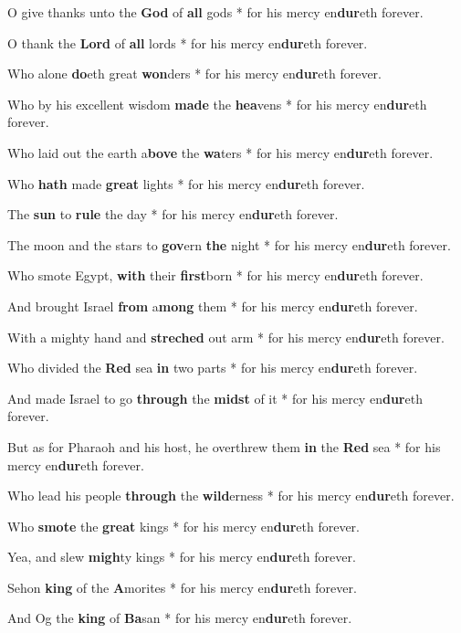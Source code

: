 \begin{multicols}{2}
	O give thanks unto the \textbf{God} of \textbf{all} gods * for his mercy en\textbf{dur}eth forever.
	
	O thank the \textbf{Lord} of \textbf{all} lords * for his mercy en\textbf{dur}eth forever.
	
	Who alone \textbf{do}eth great \textbf{won}ders * for his mercy en\textbf{dur}eth forever.
	
	Who by his excellent wisdom \textbf{made} the \textbf{hea}vens * for his mercy en\textbf{dur}eth forever.
	
	Who laid out the earth a\textbf{bove} the \textbf{wa}ters * for his mercy en\textbf{dur}eth forever.
	
	Who \textbf{hath} made \textbf{great} lights * for his mercy en\textbf{dur}eth forever.
	
	The \textbf{sun} to \textbf{rule} the day * for his mercy en\textbf{dur}eth forever.
	
	The moon and the stars to \textbf{gov}ern \textbf{the} night * for his mercy en\textbf{dur}eth forever.
	
	Who smote Egypt, \textbf{with} their \textbf{first}born * for his mercy en\textbf{dur}eth forever.
	
	And brought Israel \textbf{from} a\textbf{mong} them * for his mercy en\textbf{dur}eth forever.
	
	With a mighty hand and \textbf{streched} out arm * for his mercy en\textbf{dur}eth forever.
	
	Who divided the \textbf{Red} sea \textbf{in} two parts * for his mercy en\textbf{dur}eth forever.
	
	And made Israel to go \textbf{through} the \textbf{midst} of it * for his mercy en\textbf{dur}eth forever.
	
	But as for Pharaoh and his host, he overthrew them \textbf{in} the \textbf{Red} sea * for his mercy en\textbf{dur}eth forever.
	
	Who lead his people \textbf{through} the \textbf{wild}erness * for his mercy en\textbf{dur}eth forever.
	
	Who \textbf{smote} the \textbf{great} kings * for his mercy en\textbf{dur}eth forever.
	
	Yea, and slew \textbf{migh}ty kings * for his mercy en\textbf{dur}eth forever.
	
	Sehon \textbf{king} of the \textbf{A}morites * for his mercy en\textbf{dur}eth forever.
	
	And Og the \textbf{king} of \textbf{Ba}san * for his mercy en\textbf{dur}eth forever.
	

\end{multicols}
